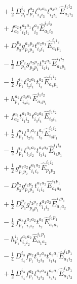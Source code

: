 \documentclass[11pt]{article}
\begin{document}
\begin{align}
&\quad + \tfrac{1}{2}\, D^{i_{4}}_{p_{1}} f^{a_{2}}_{p_{1}} t^{a_{2}a_{3}}_{i_{4}i_{3}} t^{a_{3}a_{1}}_{i_{2}i_{1}} \hat{E}^{i_{1}i_{2}}_{a_{1}i_{3}} \\
&\quad + f^{a_{2}}_{a_{3}} t^{a_{2}a_{1}}_{i_{2}i_{1}} t^{a_{3}}_{i_{3}} \hat{E}^{i_{1}i_{2}}_{a_{1}i_{3}} \\
&\quad + D^{p_{2}}_{p_{3}} g^{a_{2}p_{2}}_{p_{1}p_{3}} t^{a_{2}a_{1}}_{i_{2}i_{1}} \hat{E}^{i_{1}i_{2}}_{a_{1}p_{1}} \\
&\quad - \tfrac{1}{2}\, D^{p_{2}}_{p_{3}} g^{a_{2}p_{2}}_{p_{3}p_{1}} t^{a_{2}a_{1}}_{i_{2}i_{1}} \hat{E}^{i_{1}i_{2}}_{a_{1}p_{1}} \\
&\quad - \tfrac{1}{2}\, f^{i_{3}}_{p_{1}} t^{a_{2}a_{1}}_{i_{2}i_{1}} t^{a_{2}}_{i_{3}} \hat{E}^{i_{1}i_{2}}_{a_{1}p_{1}} \\
&\quad + h^{a_{2}}_{p_{1}} t^{a_{2}a_{1}}_{i_{2}i_{1}} \hat{E}^{i_{1}i_{2}}_{a_{1}p_{1}} \\
&\quad + f^{a_{1}}_{a_{2}} t^{a_{1}a_{3}}_{i_{1}i_{2}} t^{a_{2}a_{3}}_{i_{3}i_{4}} \hat{E}^{i_{1}i_{2}}_{i_{3}i_{4}} \\
&\quad + \tfrac{1}{2}\, f^{a_{1}}_{p_{1}} t^{a_{1}a_{2}}_{i_{2}i_{1}} t^{a_{2}}_{i_{3}} \hat{E}^{i_{1}i_{2}}_{i_{3}p_{1}} \\
&\quad - \tfrac{1}{2}\, f^{i_{4}}_{p_{1}} t^{a_{1}a_{2}}_{i_{1}i_{2}} t^{a_{1}a_{2}}_{i_{3}i_{4}} \hat{E}^{i_{1}i_{2}}_{i_{3}p_{1}} \\
&\quad + \tfrac{1}{2}\, g^{a_{1}a_{2}}_{p_{1}p_{2}} t^{a_{1}a_{2}}_{i_{1}i_{2}} \hat{E}^{i_{1}i_{2}}_{p_{1}p_{2}} \\
&\quad - D^{p_{2}}_{p_{3}} g^{i_{2}p_{2}}_{p_{1}p_{3}} t^{a_{1}a_{2}}_{i_{1}i_{2}} \hat{E}^{i_{1}p_{1}}_{a_{1}a_{2}} \\
&\quad + \tfrac{1}{2}\, D^{p_{2}}_{p_{3}} g^{i_{2}p_{2}}_{p_{3}p_{1}} t^{a_{1}a_{2}}_{i_{1}i_{2}} \hat{E}^{i_{1}p_{1}}_{a_{1}a_{2}} \\
&\quad - \tfrac{1}{2}\, f^{a_{3}}_{p_{1}} t^{a_{1}a_{2}}_{i_{1}i_{2}} t^{a_{3}}_{i_{2}} \hat{E}^{i_{1}p_{1}}_{a_{1}a_{2}} \\
&\quad - h^{i_{2}}_{p_{1}} t^{a_{1}a_{2}}_{i_{1}i_{2}} \hat{E}^{i_{1}p_{1}}_{a_{1}a_{2}} \\
&\quad - \tfrac{1}{4}\, D^{i_{3}}_{i_{4}} f^{a_{2}}_{p_{1}} t^{a_{2}a_{3}}_{i_{2}i_{3}} t^{a_{3}a_{1}}_{i_{1}i_{4}} \hat{E}^{i_{1}p_{1}}_{a_{1}i_{2}} \\
&\quad + \tfrac{1}{2}\, D^{i_{3}}_{i_{4}} f^{a_{2}}_{p_{1}} t^{a_{2}a_{3}}_{i_{2}i_{3}} t^{a_{3}a_{1}}_{i_{4}i_{1}} \hat{E}^{i_{1}p_{1}}_{a_{1}i_{2}} \\

\end{align}
\end{document}
